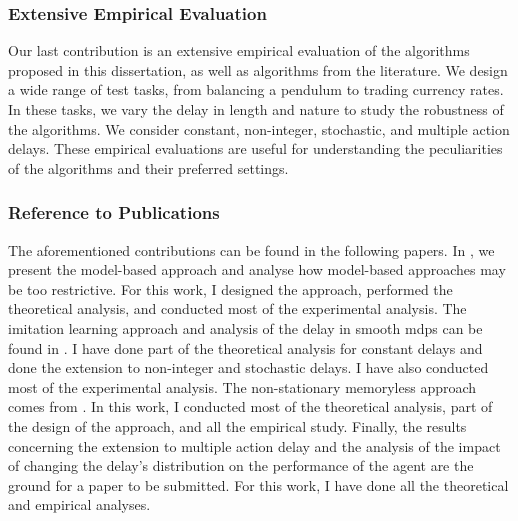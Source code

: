 \subsubsection{Extensive Empirical Evaluation}
Our last contribution is an extensive empirical evaluation of the algorithms proposed in this dissertation, as well as algorithms from the literature.
We design a wide range of test tasks, from balancing a pendulum to trading currency rates.
In these tasks, we vary the delay in length and nature to study the robustness of the algorithms. 
We consider constant, non-integer, stochastic, and multiple action delays. 
These empirical evaluations are useful for understanding the peculiarities of the algorithms and their preferred settings.


\subsubsection{Reference to Publications}
The aforementioned contributions can be found in the following papers. 
In \cite{liotet2021learning}, we present the model-based approach and analyse how model-based approaches may be too restrictive. 
For this work, I designed the approach, performed the theoretical analysis, and conducted most of the experimental analysis.
The imitation learning approach and analysis of the delay in smooth \glspl{mdp} can be found in \cite{liotet2022delayed}.
I have done part of the theoretical analysis for constant delays and done the extension to non-integer and stochastic delays. I have also conducted most of the experimental analysis.
The non-stationary memoryless approach comes from \cite{liotet2022lifelong}.
In this work, I conducted most of the theoretical analysis, part of the design of the approach, and all the empirical study. 
Finally, the results concerning the extension to multiple action delay and the analysis of the impact of changing the delay's distribution on the performance of the agent are the ground for a paper to be submitted. 
For this work, I have done all the theoretical and empirical analyses.





